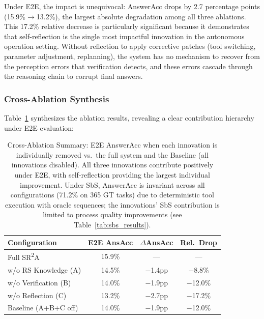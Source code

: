 \documentclass[journal]{IEEEtran}
\begin{document}
Under E2E, the impact is unequivocal: AnswerAcc drops by 2.7 percentage points (15.9\%$\rightarrow$13.2\%), the largest absolute degradation among all three ablations.
This 17.2\% relative decrease is particularly significant because it demonstrates that self-reflection is the single most impactful innovation in the autonomous operation setting.
Without reflection to apply corrective patches (tool switching, parameter adjustment, replanning), the system has no mechanism to recover from the perception errors that verification detects, and these errors cascade through the reasoning chain to corrupt final answers.

\subsubsection{Cross-Ablation Synthesis}

Table~\ref{tab:ablation_summary} synthesizes the ablation results, revealing a clear contribution hierarchy under E2E evaluation:

\begin{table}[t]
\centering
\caption{Cross-Ablation Summary: E2E AnswerAcc when each innovation is individually removed vs.\ the full system and the Baseline (all innovations disabled). All three innovations contribute positively under E2E, with self-reflection providing the largest individual improvement. Under SbS, AnswerAcc is invariant across all configurations (71.2\% on 365 GT tasks) due to deterministic tool execution with oracle sequences; the innovations' SbS contribution is limited to process quality improvements (see Table~\ref{tab:sbs_results}).}
\label{tab:ablation_summary}
\begin{tabular}{l c c c}
\toprule
\textbf{Configuration} & \textbf{E2E AnsAcc} & \textbf{$\Delta$AnsAcc} & \textbf{Rel.\ Drop} \\
\midrule
Full SR\textsuperscript{2}A & 15.9\% & --- & --- \\
w/o RS Knowledge (A) & 14.5\% & $-$1.4pp & $-$8.8\% \\
w/o Verification (B) & 14.0\% & $-$1.9pp & $-$12.0\% \\
w/o Reflection (C) & 13.2\% & $-$2.7pp & $-$17.2\% \\
\midrule
Baseline (A+B+C off) & 14.0\% & $-$1.9pp & $-$12.0\% \\
\bottomrule
\end{tabular}
\end{table}
\end{document}

